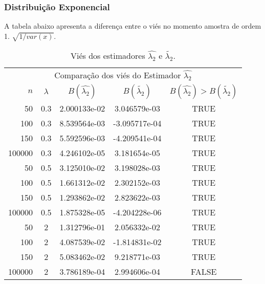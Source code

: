 \begin{frame}
\frametitle{Distribuição Exponencial}
A tabela abaixo apresenta a diferença entre o viés no momento amostra de ordem 1.  $\sqrt{1/var(x)}$.


\begin{table}[H]
\caption{Viés dos estimadores $\hat{\lambda_{2}}$ e $\tilde{\lambda_{2}}$.}
\label{tab:p1Vies}
\tiny
\centering
\begin{tabular}{rcccc}
\toprule
\multicolumn{5}{c}{Comparação dos viés do Estimador $\hat{\lambda_{2}}$}\\
$n$ & $\lambda$ & $B(\hat{\lambda_{2}})$ & $B(\tilde{\lambda_{2}})$ & $B(\hat{\lambda_{2}})>B(\tilde{\lambda_{2}})$ \\
\midrule
50 & 0.3 & 2.000133e-02 & 3.046579e-03  & TRUE \\
100 & 0.3 & 8.539564e-03 & -3.095717e-04 & TRUE \\
150 & 0.3 & 5.592596e-03 & -4.209541e-04 & TRUE \\
100000 & 0.3 & 4.246102e-05 & 3.181654e-05 & TRUE \\
\midrule
50 & 0.5 & 3.125010e-02 & 3.198028e-03  & TRUE \\
100 & 0.5 &  1.661312e-02 & 2.302152e-03 & TRUE \\
150 & 0.5 &  1.293862e-02  & 2.823622e-03 & TRUE\\
100000 & 0.5 & 1.875328e-05 & -4.204228e-06 & TRUE \\
\midrule
50 & 2 & 1.312796e-01 &  2.056332e-02 & TRUE \\
100 & 2 & 4.087539e-02 & -1.814831e-02 & TRUE \\
150 & 2 & 5.083462e-02 & 9.218771e-03 & TRUE \\
100000 & 2 & 3.786189e-04 & 2.994606e-04 & FALSE \\
\bottomrule
\end{tabular}
\end{table}
\end{frame}

